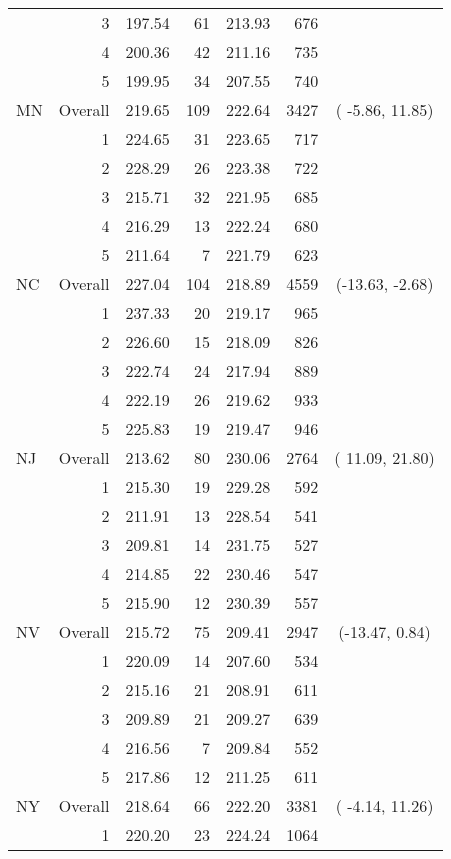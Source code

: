 \begin{longtable}{lrrr@{\extracolsep{.25cm}}rrc}
   & 3 & 197.54 &  61 & 213.93 & 676 &  \\ 
   & 4 & 200.36 &  42 & 211.16 & 735 &  \\ 
   & 5 & 199.95 &  34 & 207.55 & 740 &  \\ 
   \hline
MN & Overall & 219.65 & 109 & 222.64 & 3427 & ( -5.86,  11.85) \\ 
   & 1 & 224.65 &  31 & 223.65 & 717 &  \\ 
   & 2 & 228.29 &  26 & 223.38 & 722 &  \\ 
   & 3 & 215.71 &  32 & 221.95 & 685 &  \\ 
   & 4 & 216.29 &  13 & 222.24 & 680 &  \\ 
   & 5 & 211.64 &   7 & 221.79 & 623 &  \\ 
   \hline
NC & Overall & 227.04 & 104 & 218.89 & 4559 & (-13.63,  -2.68) \\ 
   & 1 & 237.33 &  20 & 219.17 & 965 &  \\ 
   & 2 & 226.60 &  15 & 218.09 & 826 &  \\ 
   & 3 & 222.74 &  24 & 217.94 & 889 &  \\ 
   & 4 & 222.19 &  26 & 219.62 & 933 &  \\ 
   & 5 & 225.83 &  19 & 219.47 & 946 &  \\ 
   \hline
NJ & Overall & 213.62 &  80 & 230.06 & 2764 & ( 11.09,  21.80) \\ 
   & 1 & 215.30 &  19 & 229.28 & 592 &  \\ 
   & 2 & 211.91 &  13 & 228.54 & 541 &  \\ 
   & 3 & 209.81 &  14 & 231.75 & 527 &  \\ 
   & 4 & 214.85 &  22 & 230.46 & 547 &  \\ 
   & 5 & 215.90 &  12 & 230.39 & 557 &  \\ 
   \hline
NV & Overall & 215.72 &  75 & 209.41 & 2947 & (-13.47,   0.84) \\ 
   & 1 & 220.09 &  14 & 207.60 & 534 &  \\ 
   & 2 & 215.16 &  21 & 208.91 & 611 &  \\ 
   & 3 & 209.89 &  21 & 209.27 & 639 &  \\ 
   & 4 & 216.56 &   7 & 209.84 & 552 &  \\ 
   & 5 & 217.86 &  12 & 211.25 & 611 &  \\ 
   \hline
NY & Overall & 218.64 &  66 & 222.20 & 3381 & ( -4.14,  11.26) \\ 
   & 1 & 220.20 &  23 & 224.24 & 1064 &  \\ 

\end{longtable}
